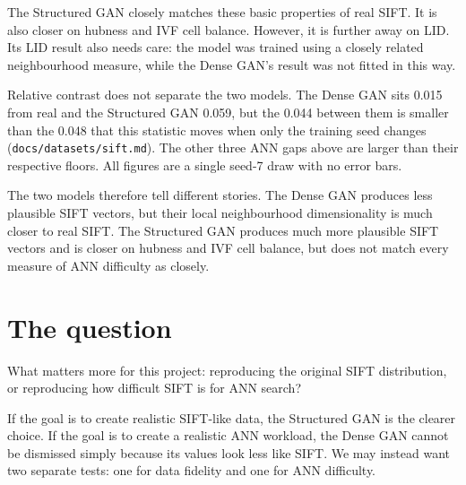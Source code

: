 \documentclass[10pt]{article}
\begin{document}
The Structured GAN closely matches these basic properties of real SIFT.  It is
also closer on hubness and IVF cell balance.  However, it is further away on
LID.  Its LID result also needs care: the model was trained using a closely
related neighbourhood measure, while the Dense GAN's result was not fitted in
this way.

Relative contrast does not separate the two models.  The Dense GAN sits
0.015 from real and the Structured GAN 0.059, but the 0.044 between them is
smaller than the 0.048 that this statistic moves when only the training seed
changes (\texttt{docs/datasets/sift.md}).
The other three ANN gaps above are larger than their respective floors.  All
figures are a single seed-7 draw with no error bars.

The two models therefore tell different stories.  The Dense GAN produces less
plausible SIFT vectors, but their local neighbourhood dimensionality is much
closer to real SIFT.  The Structured GAN produces much more plausible SIFT
vectors and is closer on hubness and IVF cell balance, but does not match
every measure of ANN difficulty as closely.

\section*{The question}

What matters more for this project: reproducing the original SIFT distribution,
or reproducing how difficult SIFT is for ANN search?

If the goal is to create realistic SIFT-like data, the Structured GAN is the
clearer choice.  If the goal is to create a realistic ANN workload, the Dense
GAN cannot be dismissed simply because its values look less like SIFT.  We may
instead want two separate tests: one for data fidelity and one for ANN
difficulty.
\end{document}

